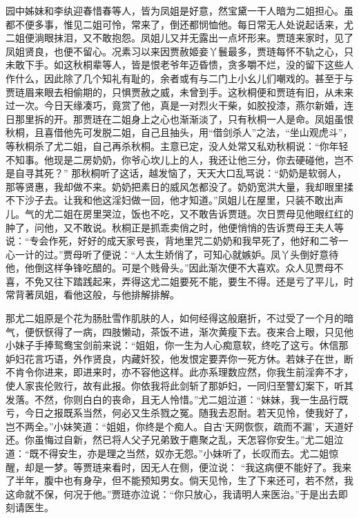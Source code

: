 \begin{parag}


    园中姊妹和李纨迎春惜春等人，皆为凤姐是好意，然宝黛一干人暗为二姐担心。虽都不便多事，惟见二姐可怜，常来了，倒还都悯恤他。每日常无人处说起话来，尤二姐便淌眼抹泪，又不敢抱怨。凤姐儿又并无露出一点坏形来。贾琏来家时，见了凤姐贤良，也便不留心。况素习以来因贾赦姬妾丫鬟最多，贾琏每怀不轨之心，只未敢下手。如这秋桐辈等人，皆是恨老爷年迈昏愦，贪多嚼不烂，没的留下这些人作什么，因此除了几个知礼有耻的，余者或有与二门上小幺儿们嘲戏的。甚至于与贾琏眉来眼去相偷期的，只惧贾赦之威，未曾到手。这秋桐便和贾琏有旧，从未来过一次。今日天缘凑巧，竟赏了他，真是一对烈火干柴，如胶投漆，燕尔新婚，连日那里拆的开。那贾琏在二姐身上之心也渐渐淡了，只有秋桐一人是命。凤姐虽恨秋桐，且喜借他先可发脱二姐，自己且抽头，用“借剑杀人”之法，“坐山观虎斗”，等秋桐杀了尤二姐，自己再杀秋桐。主意已定，没人处常又私劝秋桐说：“你年轻不知事。他现是二房奶奶，你爷心坎儿上的人，我还让他三分，你去硬碰他，岂不是自寻其死？” 那秋桐听了这话，越发恼了，天天大口乱骂说：“奶奶是软弱人，那等贤惠，我却做不来。奶奶把素日的威风怎都没了。奶奶宽洪大量，我却眼里揉不下沙子去。让我和他这淫妇做一回，他才知道。”凤姐儿在屋里，只装不敢出声儿。气的尤二姐在房里哭泣，饭也不吃，又不敢告诉贾琏。次日贾母见他眼红红的肿了，问他，又不敢说。秋桐正是抓乖卖俏之时，他便悄悄的告诉贾母王夫人等说：“专会作死，好好的成天家号丧，背地里咒二奶奶和我早死了，他好和二爷一心一计的过。”贾母听了便说：“人太生娇俏了，可知心就嫉妒。凤丫头倒好意待他，他倒这样争锋吃醋的。可是个贱骨头。”因此渐次便不大喜欢。众人见贾母不喜，不免又往下踏践起来，弄得这尤二姐要死不能，要生不得。还是亏了平儿，时常背著凤姐，看他这般，与他排解排解。
\end{parag}


\begin{parag}


    那尤二姐原是个花为肠肚雪作肌肤的人，如何经得这般磨折，不过受了一个月的暗气，便恹恹得了一病，四肢懒动，茶饭不进，渐次黄瘦下去。夜来合上眼，只见他小妹子手捧鸳鸯宝剑前来说：“姐姐，你一生为人心痴意软，终吃了这亏。休信那妒妇花言巧语，外作贤良，内藏奸狡，他发恨定要弄你一死方休。若妹子在世，断不肯令你进来，即进来时，亦不容他这样。此亦系理数应然，你我生前淫奔不才，使人家丧伦败行，故有此报。你依我将此剑斩了那妒妇，一同归至警幻案下，听其发落。不然，你则白白的丧命，且无人怜惜。”尤二姐泣道：“妹妹，我一生品行既亏，今日之报既系当然，何必又生杀戮之冤。随我去忍耐。若天见怜，使我好了，岂不两全。”小妹笑道：“姐姐，你终是个痴人。自古‘天网恢恢，疏而不漏’，天道好还。你虽悔过自新，然已将人父子兄弟致于麀聚之乱，天怎容你安生。”尤二姐泣道：“既不得安生，亦是理之当然，奴亦无怨。”小妹听了，长叹而去。尤二姐惊醒，却是一梦。等贾琏来看时，因无人在侧，便泣说： “我这病便不能好了。我来了半年，腹中也有身孕，但不能预知男女。倘天见怜，生了下来还可，若不然，我这命就不保，何况于他。”贾琏亦泣说：“你只放心，我请明人来医治。”于是出去即刻请医生。
\end{parag}


